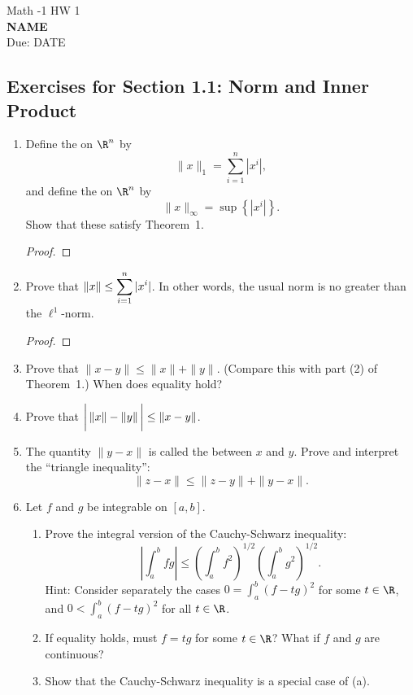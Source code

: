 \documentclass[11pt, a4paper, parskip=full]{scrartcl}
\begin{document}
\begin{center}
{\Large Math -1 \hspace{0.5cm} HW 1}\\
\textbf{NAME}\\ %
Due: DATE %
\end{center}

\vspace{0.2 cm}


\subsection*{Exercises for Section 1.1: Norm and Inner Product}

\begin{enumerate}
\item\label{norms}
Define the  on $\R^n$ by
	$$\|x\|_1 = \sum_{i=1}^n |x^i|,$$
	and define the  on $\R^n$ by
	$$\|x\|_\infty = \sup\left\{|x^i|\right\}.$$
	Show that these satisfy Theorem~1.
\begin{proof}
\end{proof}

\item	Prove that $\displaystyle \|x\|\leq \sum_{i=1}^n |x^i|$.  In other words, the usual norm is no greater than the $\ell^1$-norm.
\begin{proof}
\end{proof}

\item	Prove that $\|x-y\| \leq \|x\| + \|y\|$.  (Compare this with part (2) of
	Theorem~1.)  When does equality hold?

\item	Prove that $\displaystyle \bigg| \, \|x\|-\|y\| \, \bigg| \leq \|x-y\|$.

\item	The quantity $\|y-x\|$ is called the  between $x$ and
$y$.  Prove and interpret the ``triangle inequality'':
$$\|z-x\| \leq \|z-y\| + \|y-x\|.$$

\item\label{caushw}	Let $f$ and $g$ be integrable on $[a,b]$.
\begin{enumerate}
	\item	Prove the integral version of the Cauchy-Schwarz inequality:
	$$\left|\int_a^b fg\right| \leq \left(\int_a^b
	f^2\right)^{1/2}\left(\int_a^b g^2\right)^{1/2}.$$
	Hint:  Consider separately the cases $0 = \int_a^b(f-t g)^2$ for
	some $t\in\R$, and $0<\int_a^b(f-t g)^2$ for all
	$t\in\R$.
	\item	If equality holds, must $f=t g$ for some $t\in\R$?
	What if $f$ and $g$ are continuous?
	\item	Show that the Cauchy-Schwarz inequality is a special case of
	(a).


\end{enumerate}
\end{enumerate}
\end{document}
